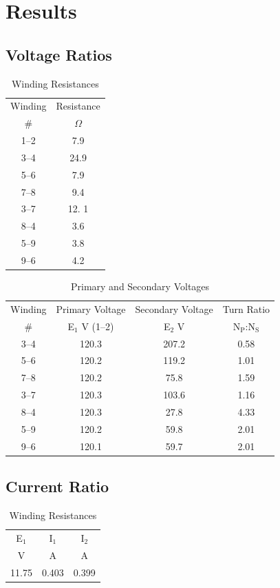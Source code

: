 \documentclass{article}
\begin{document}
\section{Results}
\subsection{Voltage Ratios}
\begin{table}[H]
  \centering
  \begin{tabular}{cc}
    \hline
    Winding & Resistance \\
    \# & $\Omega$ \\
    \hline
    1--2 &  7.9 \\
    3--4 & 24.9 \\
    5--6 &  7.9 \\
    7--8 &  9.4 \\
    3--7 & 12. 1\\
    8--4 &  3.6 \\
    5--9 &  3.8 \\
    9--6 &  4.2 \\
  \end{tabular}
  \caption{Winding Resistances}
  \label{tab:wind_res}
\end{table}

\begin{table}[H]
  \centering
  \begin{tabular}{cccc}
    \hline
    Winding & Primary Voltage & Secondary Voltage & Turn Ratio \\
    \# & E$_1$ V (1--2) & E$_2$ V & N$_\text{P}$:N$_\text{S}$\\
    \hline
    3--4 & 120.3 & 207.2 & 0.58 \\
    5--6 & 120.2 & 119.2 & 1.01 \\
    7--8 & 120.2 &  75.8 & 1.59 \\
    3--7 & 120.3 & 103.6 & 1.16 \\
    8--4 & 120.3 &  27.8 & 4.33 \\
    5--9 & 120.2 &  59.8 & 2.01 \\
    9--6 & 120.1 &  59.7 & 2.01 \\
  \end{tabular}
  \caption{Primary and Secondary Voltages}
  \label{tab:volt_rat}
\end{table}

\subsection{Current Ratio}
\begin{table}[H]
  \centering
  \begin{tabular}{ccc}
    \hline
    E$_1$ & I$_1$ & I$_2$ \\
    V & A & A \\
    \hline
    11.75 & 0.403 & 0.399 \\
  \end{tabular}
  \caption{Winding Resistances}
  \label{tab:curr_rat}
\end{table}
\end{document}
